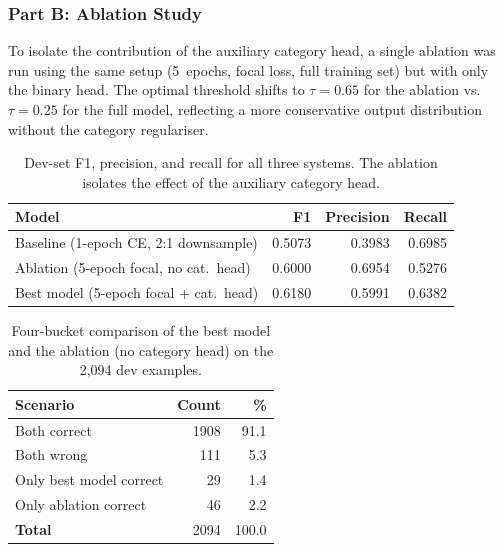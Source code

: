 \documentclass{article}
\begin{document}
\subsubsection*{Part B: Ablation Study}

To isolate the contribution of the auxiliary category head, a single ablation was run using the same setup (5~epochs, focal loss, full training set) but with only the binary head. The optimal threshold shifts to $\tau=0.65$ for the ablation vs.\ $\tau=0.25$ for the full model, reflecting a more conservative output distribution without the category regulariser.

\begin{table}[ht]
    \centering
    \begin{tabular}{lrrr}
        \toprule
        \textbf{Model} & \textbf{F1} & \textbf{Precision} & \textbf{Recall} \\
        \midrule
        Baseline (1-epoch CE, 2:1 downsample)   & 0.5073 & 0.3983 & 0.6985 \\
        Ablation (5-epoch focal, no cat.\ head) & 0.6000 & 0.6954 & 0.5276 \\
        Best model (5-epoch focal + cat.\ head) & 0.6180 & 0.5991 & 0.6382 \\
        \bottomrule
    \end{tabular}
    \caption{Dev-set F1, precision, and recall for all three systems. The ablation isolates the effect of the auxiliary category head.}
    \label{tab:model_summary}
\end{table}

\begin{table}[ht]
    \centering
    \begin{tabular}{lrr}
        \toprule
        \textbf{Scenario} & \textbf{Count} & \textbf{\%} \\
        \midrule
        Both correct             & 1908 & 91.1 \\
        Both wrong               &  111 &  5.3 \\
        Only best model correct  &   29 &  1.4 \\
        Only ablation correct    &   46 &  2.2 \\
        \midrule
        \textbf{Total}           & 2094 & 100.0 \\
        \bottomrule
    \end{tabular}
    \caption{Four-bucket comparison of the best model and the ablation (no category head) on the 2,094 dev examples.}
    \label{tab:buckets_ablation}
\end{table}
\end{document}
